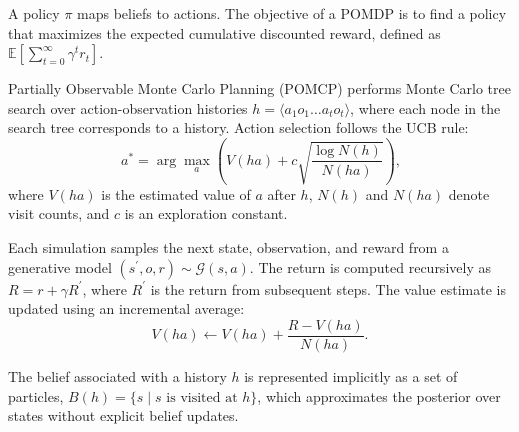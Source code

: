 A policy $\pi$ maps beliefs to actions. The objective of a POMDP is to find a policy that maximizes the expected cumulative discounted reward, defined as $\mathbb{E}\left[\sum_{t=0}^{\infty} \gamma^t r_t \right]$.


Partially Observable Monte Carlo Planning (POMCP) performs Monte Carlo tree search over action-observation histories $h = \langle a_1 o_1 \dots a_t o_t \rangle$, where each node in the search tree corresponds to a history. Action selection follows the UCB rule:
\begin{equation}~\label{eq:ucb}
a^* = \arg\max_a \left( V(ha) + c \sqrt{\frac{\log N(h)}{N(ha)}} \right),
\end{equation}
where $V(ha)$ is the estimated value of $a$ after $h$, $N(h)$ and $N(ha)$ denote visit counts, and $c$ is an exploration constant.

Each simulation samples the next state, observation, and reward from a generative model $(s^\prime, o, r) \sim \mathcal{G}(s,a)$. The return is computed recursively as $R = r + \gamma R^\prime$, where $R^\prime$ is the return from subsequent steps. The value estimate is updated using an incremental average:
\[
V(ha) \leftarrow V(ha) + \frac{R - V(ha)}{N(ha)}.
\]

The belief associated with a history $h$ is represented implicitly as a set of particles, $B(h) = \{ s \mid s \text{ is visited at } h \}$, which approximates the posterior over states without explicit belief updates.
